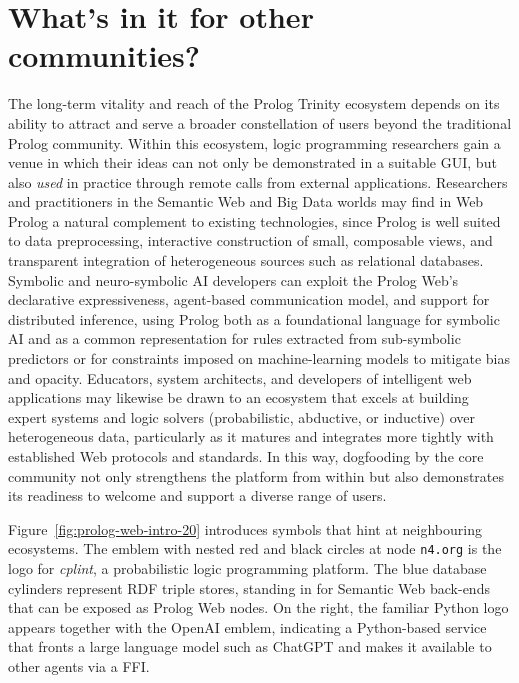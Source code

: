 \chapter{What's in it for other communities?}\label{sec:for-other-communities}

\vspace{1cm}

The long-term vitality and reach of the Prolog Trinity ecosystem depends on its ability to attract and serve a broader constellation of users beyond the traditional Prolog community. Within this ecosystem, logic programming researchers gain a venue in which their ideas can not only be demonstrated in a suitable GUI, but also \textit{used} in practice through remote calls from external applications. Researchers and practitioners in the Semantic Web and Big Data worlds may find in Web Prolog a natural complement to existing technologies, since Prolog is well suited to data preprocessing, interactive construction of small, composable views, and transparent integration of heterogeneous sources such as relational databases. Symbolic and neuro-symbolic AI developers can exploit the Prolog Web's declarative expressiveness, agent-based communication model, and support for distributed inference, using Prolog both as a foundational language for symbolic AI and as a common representation for rules extracted from sub-symbolic predictors or for constraints imposed on machine-learning models to mitigate bias and opacity. Educators, system architects, and developers of intelligent web applications may likewise be drawn to an ecosystem that excels at building expert systems and logic solvers (probabilistic, abductive, or inductive) over heterogeneous data, particularly as it matures and integrates more tightly with established Web protocols and standards. In this way, dogfooding by the core community not only strengthens the platform from within but also demonstrates its readiness to welcome and support a diverse range of users.

Figure~\ref{fig:prolog-web-intro-20} introduces symbols that hint at neighbouring ecosystems. The emblem with nested red and black circles at node \texttt{n4.org} is the logo for \textit{cplint}, a probabilistic logic programming platform. The blue database cylinders represent RDF triple stores, standing in for Semantic Web back-ends that can be exposed as Prolog Web nodes. On the right, the familiar Python logo appears together with the OpenAI emblem, indicating a Python-based service that fronts a large language model such as ChatGPT and makes it available to other agents via a FFI. 

